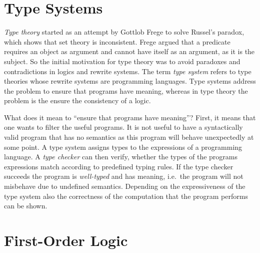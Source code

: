 \section{Type Systems}
\textit{Type theory} started as an attempt by Gottlob Frege to solve
Russel's paradox, which shows that \naive{} set theory is
inconsistent. Frege argued that a predicate requires an object as
argument and cannot have itself as an argument, as it is the
subject. So the initial motivation for type theory was to avoid
paradoxes and contradictions in logics and rewrite systems. The term
\textit{type system} refers to type theories whose rewrite systems are
programming languages. Type systems address the problem to ensure that
programs have meaning, whereas in type theory the problem is the
ensure the consistency of a logic.

What does it mean to ``ensure that programs have meaning''? First, it
means that one wants to filter the useful programs. It is not useful
to have a syntactically valid program that has no semantics as this
program will behave unexpectedly at some point. A type system assigns
types to the expressions of a programming language. A \textit{type
  checker} can then verify, whether the types of the programs
expressions match according to predefined typing rules. If the type
checker succeeds the program is \textit{well-typed} and has meaning,
i.e.\ the program will not misbehave due to undefined semantics. Depending
on the expressiveness of the type system also the correctness of the
computation that the program performs can be shown.

\section{First-Order Logic}

